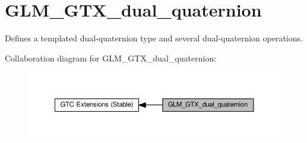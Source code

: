 \hypertarget{group__gtc__dual__quaternion}{}\section{G\+L\+M\+\_\+\+G\+T\+X\+\_\+dual\+\_\+quaternion}
\label{group__gtc__dual__quaternion}


Defines a templated dual-\/quaternion type and several dual-\/quaternion operations.  


Collaboration diagram for G\+L\+M\+\_\+\+G\+T\+X\+\_\+dual\+\_\+quaternion\+:\nopagebreak
\begin{figure}[H]
\begin{center}
\leavevmode
\includegraphics[width=350pt]{group__gtc__dual__quaternion}
\end{center}
\end{figure}
